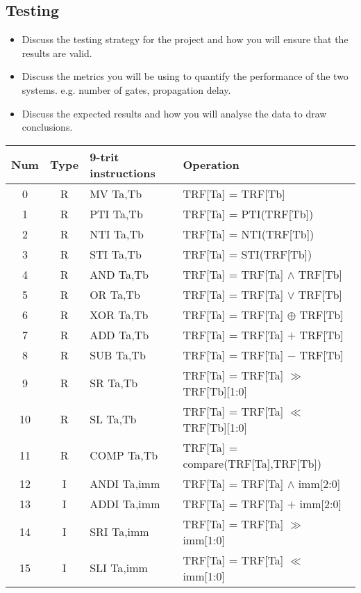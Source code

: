 \documentclass[12pt]{article}
\begin{document}
\subsection{Testing}

\begin{itemize}
    \item Discuss the testing strategy for the project and how you will ensure that the results are valid.
    \item Discuss the metrics you will be using to quantify the performance of the two systems. e.g. number of gates, propagation delay.
    \item Discuss the expected results and how you will analyse the data to draw conclusions.
\end{itemize}

\begin{table}[h]
    \begin{tabular}{|c|c|l|l|}
    \hline
    Num & Type & 9-trit instructions & Operation \\
    \hline
    0 & R & MV Ta,Tb & TRF[Ta] = TRF[Tb] \\
    1 & R & PTI Ta,Tb & TRF[Ta] = PTI(TRF[Tb]) \\
    2 & R & NTI Ta,Tb & TRF[Ta] = NTI(TRF[Tb]) \\
    3 & R & STI Ta,Tb & TRF[Ta] = STI(TRF[Tb]) \\
    4 & R & AND Ta,Tb & TRF[Ta] = TRF[Ta] $\wedge$ TRF[Tb] \\
    5 & R & OR Ta,Tb & TRF[Ta] = TRF[Ta] $\vee$ TRF[Tb] \\
    6 & R & XOR Ta,Tb & TRF[Ta] = TRF[Ta] $\oplus$ TRF[Tb] \\
    7 & R & ADD Ta,Tb & TRF[Ta] = TRF[Ta] $+$ TRF[Tb] \\
    8 & R & SUB Ta,Tb & TRF[Ta] = TRF[Ta] $-$ TRF[Tb] \\
    9 & R & SR Ta,Tb & TRF[Ta] = TRF[Ta] $\gg$ TRF[Tb][1:0] \\
    10 & R & SL Ta,Tb & TRF[Ta] = TRF[Ta] $\ll$ TRF[Tb][1:0] \\
    11 & R & COMP Ta,Tb & TRF[Ta] = compare(TRF[Ta],TRF[Tb]) \\
    12 & I & ANDI Ta,imm & TRF[Ta] = TRF[Ta] $\wedge$ imm[2:0] \\
    13 & I & ADDI Ta,imm & TRF[Ta] = TRF[Ta] $+$ imm[2:0] \\
    14 & I & SRI Ta,imm & TRF[Ta] = TRF[Ta] $\gg$ imm[1:0] \\
    15 & I & SLI Ta,imm & TRF[Ta] = TRF[Ta] $\ll$ imm[1:0] \\

\end{tabular}
\end{table}
\end{document}
